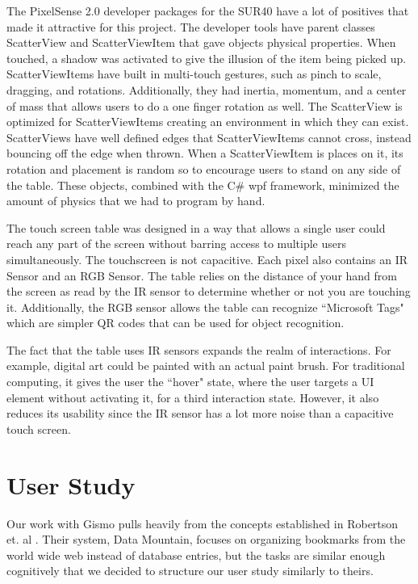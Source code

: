 \documentclass{article}
\begin{document}
The PixelSense 2.0 developer packages for the SUR40 have a lot of positives that made it attractive for this project.  The developer tools have parent classes ScatterView and ScatterViewItem that gave objects physical properties.  When touched, a shadow was activated to give the illusion of the item being picked up.  ScatterViewItems have built in multi-touch gestures, such as pinch to scale, dragging, and rotations. Additionally, they had inertia, momentum, and a center of mass that allows users to do a one finger rotation as well.  The ScatterView is optimized for ScatterViewItems creating an environment in which they can exist.  ScatterViews have well defined edges that ScatterViewItems cannot cross, instead bouncing off the edge when thrown.  When a ScatterViewItem is places on it, its rotation and placement is random so to encourage users to stand on any side of the table.  These objects, combined with the C\# wpf framework, minimized the amount of physics that we had to program by hand.

The touch screen table was designed in a way that allows a single user could reach any part of the screen without barring access to multiple users simultaneously.  The touchscreen is not capacitive.  Each pixel also contains an IR Sensor and an RGB Sensor.  The table relies on the distance of your hand from the screen as read by the IR sensor to determine whether or not you are touching it.  Additionally, the RGB sensor allows the table can recognize ``Microsoft Tags" which are simpler QR codes that can be used for object recognition.  

The fact that the table uses IR sensors expands the realm of interactions.  For example, digital art could be painted with an actual paint brush.  For traditional computing, it gives the user the ``hover" state, where the user targets a UI element without activating it, for a third interaction state.  However, it also reduces its usability since the IR sensor has a lot more noise than a capacitive touch screen.  

\section{User Study}

Our work with Gismo pulls heavily from the concepts established in Robertson et. al \cite{Robertson1998}.  Their system, Data Mountain, focuses on organizing bookmarks from the world wide web instead of database entries, but the tasks are similar enough cognitively that we decided to structure our user study similarly to theirs.  
\end{document}
